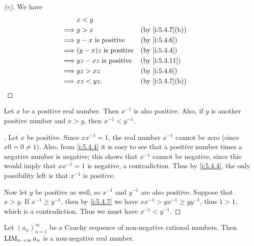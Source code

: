 \begin{proof}[(e)]
  We have
  \begin{align*}
             & x < y                                             \\
    \implies & y > x                        &  & \by{i:5.4.7}[b] \\
    \implies & y - x \text{ is positive}    &  & \by{i:5.4.6}    \\
    \implies & (y - x)z \text{ is positive} &  & \by{i:5.4.4}    \\
    \implies & yz - xz \text{ is positive}  &  & \by{i:5.3.11}   \\
    \implies & yz > xz                      &  & \by{i:5.4.6}    \\
    \implies & xz < yz.                     &  & \by{i:5.4.7}[b]
  \end{align*}
\end{proof}

\begin{prop}\label{i:5.4.8}
  Let \(x\) be a positive real number.
  Then \(x^{-1}\) is also positive.
  Also, if \(y\) is another positive number and \(x > y\), then \(x^{-1} < y^{-1}\).
\end{prop}

\begin{proof}[]
  Let \(x\) be positive.
  Since \(xx^{-1} = 1\), the real number \(x^{-1}\) cannot be zero (since \(x0 = 0 \neq 1\)).
  Also, from \cref{i:5.4.4} it is easy to see that a positive number times a negative number is negative;
  this shows that \(x^{-1}\) cannot be negative, since this would imply that \(xx^{-1} = 1\) is negative, a contradiction.
  Thus by \cref{i:5.4.4}, the only possibility left is that \(x^{-1}\) is positive.

  Now let \(y\) be positive as well, so \(x^{-1}\) and \(y^{-1}\) are also positive.
  Suppose that \(x > y\).
  If \(x^{-1} \geq y^{-1}\), then by \cref{i:5.4.7} we have \(xx^{-1} > yx^{-1} \geq yy^{-1}\), thus \(1 > 1\), which is a contradiction.
  Thus we must have \(x^{-1} < y^{-1}\).
\end{proof}

\begin{prop}\label{i:5.4.9}
  Let \((a_n)_{n = 1}^\infty\) be a Cauchy sequence of non-negative rational numbers.
  Then \(\operatorname*{LIM}_{n \to \infty} a_n\) is a non-negative real number.
\end{prop}

